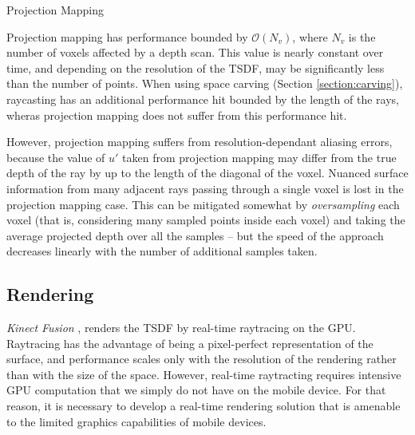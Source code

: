 \documentclass[10pt,twocolumn,letterpaper]{article}
\begin{document}
\begin{algorithm} 
	\caption{Projection Mapping}
	\label{alg:projection_mapping}
	\begin{algorithmic}[1]
		    	\label{alg:line:voxel_carve}
			\EndIf
	    \EndIf
			\label{alg:line:tsdf_update}
		\EndIf
	\EndFor
	\end{algorithmic}
\end{algorithm}

Projection mapping has performance bounded by $\mathcal{O}(N_v)$, where $N_v$ is
the number of voxels affected by a depth scan. This value is nearly constant
over time, and depending on the resolution of the TSDF, may be significantly
less than the number of points. When using space carving (Section
\ref{section:carving}), raycasting has an additional performance hit bounded by
the length of the rays, wheras projection mapping does not suffer from this
performance hit. 

However, projection mapping suffers from resolution-dependant aliasing errors,
because the value of $u'$ taken from projection mapping may differ from the true
depth of the ray by up to the length of the diagonal of the voxel. Nuanced
surface information from many adjacent rays passing through a single voxel is
lost in the projection mapping case. This can be mitigated somewhat by
\textit{oversampling} each voxel (that is, considering many sampled points
inside each voxel) and taking the average projected depth over all the samples
-- but the speed of the approach decreases linearly with the number of 
additional samples taken. 

\subsection{Rendering}
\label{section:render}
\textit{Kinect Fusion} \cite{Newcombe}, renders the TSDF by real-time
raytracing on the GPU. Raytracing has the advantage of being a pixel-perfect
representation of the surface, and performance scales only with the resolution
of the rendering rather than with the size of the space. However, real-time
raytracting requires intensive GPU computation that we simply do not have on
the mobile device. For that reason, it is necessary to develop a real-time
rendering solution that is amenable to the limited graphics capabilities of mobile devices.
\end{document}
